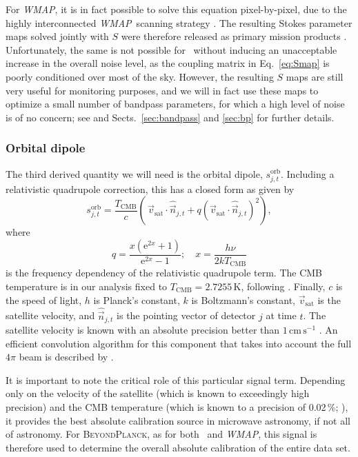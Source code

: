 \documentclass[onecolumn]{aa}
\def\WMAP{\emph{WMAP}}
\newcommand{\n}[0]{\vec{n}}
\renewcommand{\v}[0]{\vec{v}}
\newcommand{\BP}{\textsc{BeyondPlanck}}
\newcommand{\e}{\mathrm e}
\begin{document}
For \WMAP, it is in fact possible to solve this equation
pixel-by-pixel, due to the highly interconnected \WMAP\ scanning
strategy \citep{page2007}.  The resulting Stokes parameter maps solved
jointly with $S$ were therefore released as primary mission products
\citep{bennett2012}. Unfortunately, the same is not possible for
\Planck\ without inducing an unacceptable increase in the overall
noise level, as the coupling matrix in Eq.~\eqref{eq:Smap} is poorly
conditioned over most of the sky. However, the resulting $S$ maps are
still very useful for monitoring purposes, and we will in fact use
these maps to optimize a small number of bandpass parameters, for
which a high level of noise is of no concern; see \citet{bp09} and
Sects.~\ref{sec:bandpass} and \ref{sec:bp} for further details.

\subsubsection{Orbital dipole}
\label{sec:orbital}

The third derived quantity we will need is the orbital dipole,
$s^{\mathrm{orb}}_{j,t}$. Including a relativistic quadrupole
correction, this has a closed form as given by
\begin{equation}
s^{\mathrm{orb}}_{j,t} =
\frac{T_{\mathrm{CMB}}}{c}\left(\,\v_{\mathrm{sat}} \cdot
\hat{\n}_{j,t} + q (\v_{\mathrm{sat}} \cdot
\hat{\n}_{j,t})^2\right),
\end{equation}
where
\begin{equation}
  q = \frac{x(\e^{2x}+1)}{\e^{2x}-1}; \quad x = \frac{h\nu}{2kT_{\mathrm{CMB}}}
\end{equation}
is the frequency dependency of the relativistic quadrupole term. The
CMB temperature is in our analysis fixed to
${T_{\mathrm{CMB}}=2.7255\,\textrm{K}}$, following
\citet{fixsen2009}. Finally, $c$ is the speed of light, $h$ is
Planck's constant, $k$ is Boltzmann's constant, $\v_{\mathrm{sat}}$ is
the satellite velocity, and $\hat{\n}_{j,t}$ is the pointing vector of
detector $j$ at time $t$. The satellite velocity is known with an
absolute precision better than $1\,\textrm{cm}\,\textrm{s}^{-1}$
\citep{planck2020-LVII}. An efficient convolution algorithm for this component
that takes into account the full $4\pi$ beam is described by
\citet{bp08}.

It is important to note the critical role of this particular signal
term. Depending only on the velocity of the satellite (which is known to
exceedingly high precision) and the CMB temperature (which is known to
a precision of 0.02\,\%; \citealp{fixsen2009}), it provides the best
absolute calibration source in microwave astronomy, if not all of
astronomy. For \BP, as for both \Planck\ and \WMAP, this signal is
therefore used to determine the overall absolute calibration of
the entire data set.
\end{document}
